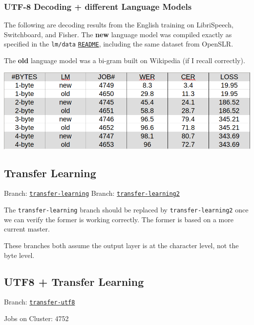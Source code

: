 \documentclass[12pt,a4paper]{article}
\begin{document}
\subsubsection*{UTF-8 Decoding + different Language Models}
The following are decoding results from the English training on LibriSpeech, Switchboard, and Fisher. The \textbf{new} language model was compiled exactly as specified in the \texttt{lm/data} \href{https://github.com/mozilla/DeepSpeech/tree/master/data/lm}{\texttt{README}}, including the same dataset from OpenSLR.

The \textbf{old} language model was a bi-gram built on Wikipedia (if I recall correctly).

\begin{center}
\includegraphics[width=.85\textwidth,keepaspectratio]{figs/1.png}
\end{center}




\subsection*{Transfer Learning}

Branch: \href{https://github.com/mozilla/DeepSpeech/tree/transfer-learning}{\texttt{transfer-learning}}
Branch: \href{https://github.com/mozilla/DeepSpeech/tree/transfer-learning2}{\texttt{transfer-learning2}}

The \texttt{transfer-learning} branch should be replaced by \texttt{transfer-learning2} once we can verify the former is working correctly. The former is based on a more current master.

These branches both assume the output layer is at the character level, not the byte level.


\subsection*{UTF8 + Transfer Learning}

Branch: \href{https://github.com/mozilla/DeepSpeech/tree/transfer-utf8}{\texttt{transfer-utf8}}

Jobs on Cluster: 4752
\end{document}
